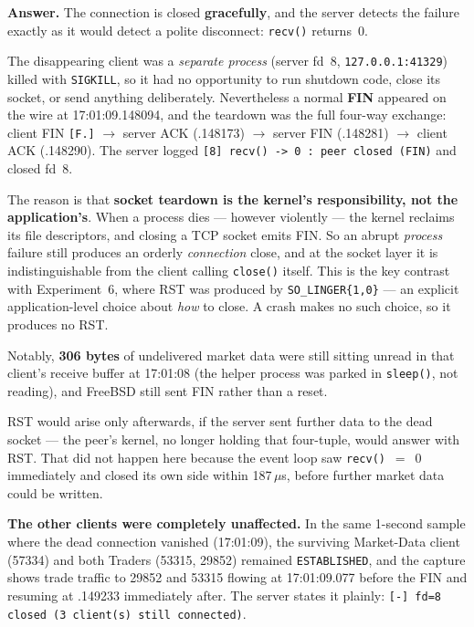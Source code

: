 \documentclass[11pt,a4paper]{article}
\newcommand{\cmd}[1]{\texttt{\small #1}}
\begin{document}
\textbf{Answer.} The connection is closed \textbf{gracefully}, and the server
detects the failure exactly as it would detect a polite disconnect:
\cmd{recv()} returns~0.

The disappearing client was a \emph{separate process} (server fd~8,
\cmd{127.0.0.1:41329}) killed with \cmd{SIGKILL}, so it had no opportunity to
run shutdown code, close its socket, or send anything deliberately. Nevertheless
a normal \textbf{FIN} appeared on the wire at 17:01:09.148094, and the teardown
was the full four-way exchange: client FIN \cmd{[F.]} $\rightarrow$ server ACK
(.148173) $\rightarrow$ server FIN (.148281) $\rightarrow$ client ACK (.148290).
The server logged \cmd{[8] recv() -> 0 : peer closed (FIN)} and closed fd~8.

The reason is that \textbf{socket teardown is the kernel's responsibility, not
the application's}. When a process dies --- however violently --- the kernel
reclaims its file descriptors, and closing a TCP socket emits FIN. So an abrupt
\emph{process} failure still produces an orderly \emph{connection} close, and at
the socket layer it is indistinguishable from the client calling \cmd{close()}
itself. This is the key contrast with Experiment~6, where RST was produced by
\cmd{SO\_LINGER\{1,0\}} --- an explicit application-level choice about \emph{how}
to close. A crash makes no such choice, so it produces no RST.

Notably, \textbf{306 bytes} of undelivered market data were still sitting unread
in that client's receive buffer at 17:01:08 (the helper process was parked in
\cmd{sleep()}, not reading), and FreeBSD still sent FIN rather than a reset.

RST would arise only afterwards, if the server sent further data to the dead
socket --- the peer's kernel, no longer holding that four-tuple, would answer
with RST. That did not happen here because the event loop saw
\cmd{recv()}~$=$~0 immediately and closed its own side within
187\,$\mu$s, before further market data could be written.

\textbf{The other clients were completely unaffected.} In the same 1-second
sample where the dead connection vanished (17:01:09), the surviving Market-Data
client (57334) and both Traders (53315, 29852) remained \cmd{ESTABLISHED}, and
the capture shows trade traffic to 29852 and 53315 flowing at 17:01:09.077
before the FIN and resuming at .149233 immediately after. The server states it
plainly: \cmd{[-] fd=8 closed (3 client(s) still connected)}.
\end{document}
